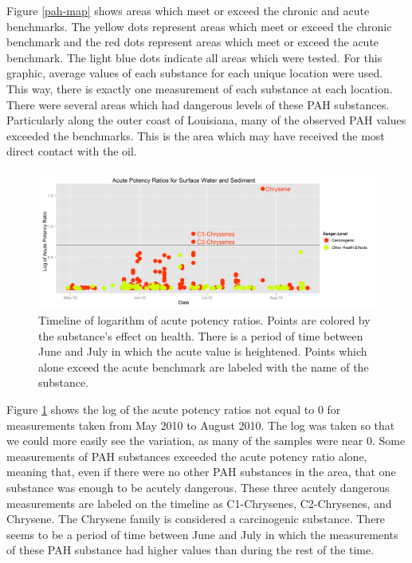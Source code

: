 \documentclass[authoryear,12pt]{elsarticle}
\begin{document}
Figure \ref{pah-map} shows areas which meet or exceed the chronic and acute benchmarks.  The yellow dots represent areas which meet or exceed the chronic benchmark and the red dots represent areas which meet or exceed the acute benchmark.  The light blue dots indicate all areas which were tested.  For this graphic, average values of each substance for each unique location were used.  This way, there is exactly one measurement of each substance at each location.  There were several areas which had dangerous levels of these PAH substances.  Particularly along the outer coast of Louisiana, many of the observed PAH values exceeded the benchmarks.  This is the area which may have received the most direct contact with the oil.  

\begin{figure}[htbp] %
   \centering
   \includegraphics[width=5in]{acute-timeline3.png} 
   \caption{Timeline of logarithm of acute potency ratios.  Points are colored by the substance's effect on health. There is a period of time between June and July in which the acute value is heightened.  Points which alone exceed the acute benchmark are labeled with the name of the substance.}
   \label{pah-timeline}
\end{figure}


Figure \ref {pah-timeline} shows the log of the acute potency ratios not equal to 0 for measurements taken from May 2010 to August 2010. The log was taken so that we could more easily see the variation, as many of the samples were near 0. Some measurements of PAH substances exceeded the acute potency ratio alone, meaning that, even if there were no other PAH substances in the area, that one substance was enough to be acutely dangerous. These three acutely dangerous measurements are labeled on the timeline as C1-Chrysenes, C2-Chrysenes, and Chrysene. The Chrysene family is considered a carcinogenic substance. There seems to be a period of time between June and July in which the measurements of these PAH substance had higher values than during the rest of the time.
\end{document}
